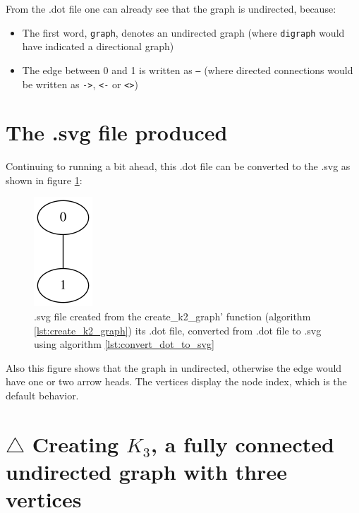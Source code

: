 From the .dot file one can already see that the graph is undirected, because:

\begin{itemize}
  \item The first word, \verb;graph;, denotes an undirected graph 
    (where \verb;digraph; would have indicated a directional graph)
  \item The edge between 0 and 1 is written as \verb;–; 
    (where directed connections would be written as \verb;->;, 
    \verb;<-; or \verb;<>;)
\end{itemize}

\section{The .svg file produced}
\label{subsec:create_k2.svg}

Continuing to running a bit ahead, 
this .dot file can be converted to the .svg 
as shown in figure \ref{fig:create_k2_graph.svg}:

\begin{figure}[!htbp]
  \includegraphics[]{create_k2_graph.png}
  \caption{.svg file created from the create\_k2\_graph' function (algorithm \ref{lst:create_k2_graph}) its .dot file, converted from .dot file to .svg using algorithm \ref{lst:convert_dot_to_svg}}
  \label{fig:create_k2_graph.svg}
\end{figure}

Also this figure shows that the graph in undirected, otherwise the edge
 would have one or two arrow heads.
 The vertices display the node index, which is the default behavior.

\section{$\triangle$ Creating $K_{3}$, a fully connected undirected graph with three vertices}
\label{subsec:create_k3_graph}

